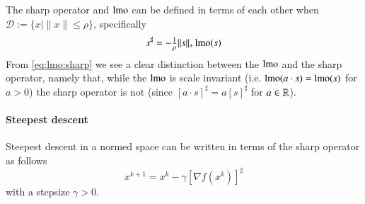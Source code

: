 The sharp operator and $\operatorname{lmo}$ can be defined in terms of each other when $\mathcal D := \{ x \mid \|x\| \leq \rho \}$, specifically
\begin{equation}\label{eq:lmo:sharp}
s^\sharp = -\tfrac{1}{\rho}\|s\|_*\operatorname{lmo}(s)
\end{equation}
From \eqref{eq:lmo:sharp} we see a clear distinction between the $\operatorname{lmo}$ and the sharp operator, namely that, while the $\operatorname{lmo}$ is scale invariant (i.e. $\operatorname{lmo}(a\cdot s)=\operatorname{lmo}(s)$ for $a>0$) the sharp operator is not (since $[a\cdot s]^\sharp=a[s]^\sharp$ for $a\in \mathbb{R}$).

\paragraph{Steepest descent}
Steepest descent in a normed space can be written in terms of the sharp operator as follows
\begin{equation*}
x^{k+1} = x^k - \gamma [\nabla f(x^k)]^\sharp
\end{equation*}
with a stepsize $\gamma > 0$.

